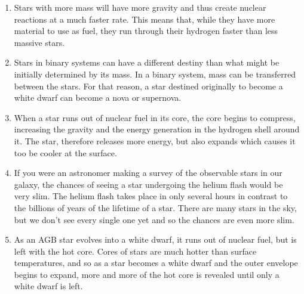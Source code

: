 \documentclass[../hw2.tex]{subfiles}
\begin{document}
    \begin{enumerate}
        \item Stars with more mass will have more gravity and thus create nuclear reactions at a much faster rate. This means that, while they have more material to use as fuel, they run through their hydrogen faster than less massive stars.
        \item Stars in binary systems can have a different destiny than what might be initially determined by its mass. In a binary system, mass can be transferred between the stars. For that reason, a star destined originally to become a white dwarf can become a nova or supernova.
        \item When a star runs out of nuclear fuel in its core, the core begins to compress, increasing the gravity and the energy generation in the hydrogen shell around it. The star, therefore releases more energy, but also expands which causes it too be cooler at the surface.
        \item If you were an astronomer making a survey of the observable stars in our galaxy, the chances of seeing a star undergoing the helium flash would be very slim. The helium flash takes place in only several hours in contrast to the billions of years of the lifetime of a star. There are many stars in the sky, but we don't see every single one yet and so the chances are even more slim.
        \item As an AGB star evolves into a white dwarf, it runs out of nuclear fuel, but is left with the hot core. Cores of stars are much hotter than surface temperatures, and so as a star becomes a white dwarf and the outer envelope begins to expand, more and more of the hot core is revealed until only a white dwarf is left.
    \end{enumerate}
\end{document}
